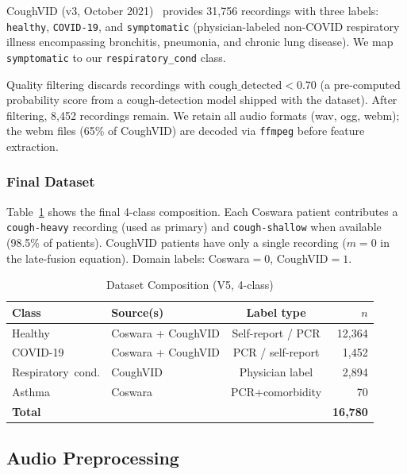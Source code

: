 \documentclass[journal]{IEEEtran}
\begin{document}
CoughVID (v3, October 2021)~\cite{coughvid} provides 31,756 recordings
with three labels: \texttt{healthy}, \texttt{COVID-19}, and
\texttt{symptomatic} (physician-labeled non-COVID respiratory illness
encompassing bronchitis, pneumonia, and chronic lung disease). We map
\texttt{symptomatic} to our \texttt{respiratory\_cond} class.

Quality filtering discards recordings with $\text{cough\_detected} < 0.70$
(a pre-computed probability score from a cough-detection model shipped
with the dataset). After filtering, 8,452 recordings remain.
We retain all audio formats (wav, ogg, webm); the webm files
(65\% of CoughVID) are decoded via \texttt{ffmpeg} before feature
extraction.

\subsubsection{Final Dataset}

Table~\ref{tab:dataset} shows the final 4-class composition.
Each Coswara patient contributes a \texttt{cough-heavy} recording
(used as primary) and \texttt{cough-shallow} when available (98.5\%
of patients). CoughVID patients have only a single recording
($m{=}0$ in the late-fusion equation). Domain labels: Coswara$=0$,
CoughVID$=1$.

\begin{table}[!t]
\renewcommand{\arraystretch}{1.3}
\caption{Dataset Composition (V5, 4-class)}
\label{tab:dataset}
\centering
\begin{tabular}{llcr}
\toprule
\textbf{Class} & \textbf{Source(s)} & \textbf{Label type} & \textbf{$n$} \\
\midrule
Healthy           & Coswara + CoughVID & Self-report / PCR   & 12,364 \\
COVID-19          & Coswara + CoughVID & PCR / self-report   &  1,452 \\
Respiratory~cond. & CoughVID           & Physician label     &  2,894 \\
Asthma            & Coswara            & PCR$+$comorbidity   &     70 \\
\midrule
\textbf{Total}    &                    &                     & \textbf{16,780} \\
\bottomrule
\end{tabular}
\end{table}

\subsection{Audio Preprocessing}
\end{document}
